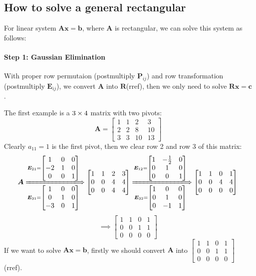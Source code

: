 \subsection{How to solve a general rectangular}
For linear system $\bm{Ax} = \bm b$, where $\bm A$ is rectangular, we can solve this system as follows:
\paragraph{Step 1: Gaussian Elimination}
With proper row permutaion (postmultiply $\bm P_{ij}$) and row transformation (postmultiply $\bm E_{ij}$), we convert $\bm A$ into $\bm R$(rref), then we only need to solve $\bm{Rx} = \bm c$.
\begin{example}
The first example is a $3\times 4$ matrix with two pivots:
\[
\bm A = \begin{bmatrix}
1&1&2&3\\2&2&8&10\\3&3&10&13
\end{bmatrix}
\]
Clearly $a_{11}=1$ is the first pivot, then we clear row 2 and row 3 of this matrix:
\[
\bm A
\xLongrightarrow[\bm E_{31} = \begin{bmatrix}
1&0&0\\0&1&0\\-3&0&1
\end{bmatrix}]{\bm E_{21} = \begin{bmatrix}
1&0&0\\-2&1&0\\0&0&1
\end{bmatrix}}
\begin{bmatrix}
1&1&2&3\\0&0&4&4\\0&0&4&4
\end{bmatrix}
\xLongrightarrow[\bm E_{32} = \begin{bmatrix}
1&0&0\\0&1&0\\0&-1&1
\end{bmatrix}]{\bm E_{12} = \begin{bmatrix}
1&-\frac{1}{2}&0\\0&1&0\\0&0&1
\end{bmatrix}}
\begin{bmatrix}
1&1&0&1\\0&0&4&4\\0&0&0&0
\end{bmatrix}\\
\]
\[\implies \begin{bmatrix}
1&1&0&1\\0&0&1&1\\0&0&0&0
\end{bmatrix}\]
If we want to solve $\bm{Ax} = \bm b$, firstly we should convert $\bm A$ into $\begin{bmatrix}
1&1&0&1\\0&0&1&1\\0&0&0&0
\end{bmatrix}$(rref).
\end{example}


